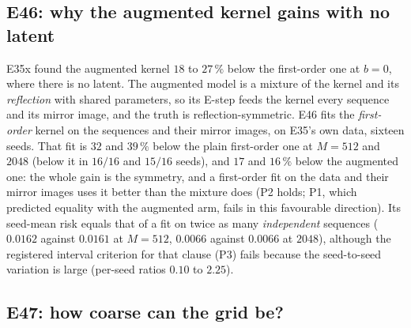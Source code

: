 \documentclass[10pt,a4paper]{article}
\theoremstyle{plain}
\theoremstyle{remark}
\begin{document}
\subsection{E46: why the augmented kernel gains with no latent}

E35x found the augmented kernel $18$ to $27\,\%$ below the first-order one at $b=0$, where there is no latent. The augmented model is a mixture of the kernel and its \emph{reflection} with shared parameters, so its E-step feeds the kernel every sequence and its mirror image, and the truth is reflection-symmetric.
E46 fits the \emph{first-order} kernel on the sequences and their mirror images, on E35's own data, sixteen seeds. That fit is $32$ and $39\,\%$ below the plain first-order one at $M=512$ and $2048$ (below it in $16/16$ and $15/16$ seeds), and $17$ and $16\,\%$ below the augmented one:
the whole gain is the symmetry, and a first-order fit on the data and their mirror images uses it better than the mixture does (P2 holds; P1, which predicted equality with the augmented arm, fails in this favourable direction). Its seed-mean risk equals that of a fit on twice as many \emph{independent} sequences ($0.0162$ against $0.0161$ at $M=512$, $0.0066$ against $0.0066$ at $2048$), although the registered interval criterion for that clause (P3) fails
because the seed-to-seed variation is large (per-seed ratios $0.10$ to $2.25$).

\subsection{E47: how coarse can the grid be?}
\end{document}
